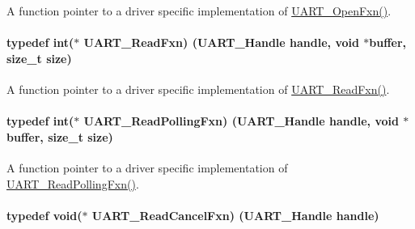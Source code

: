 A function pointer to a driver specific implementation of \hyperlink{_u_a_r_t_8h_a39e21ac60f24eb9ce32286e21de713d1}{U\+A\+R\+T\+\_\+\+Open\+Fxn()}. 

\paragraph[{U\+A\+R\+T\+\_\+\+Read\+Fxn}]{\setlength{\rightskip}{0pt plus 5cm}typedef int($\ast$ U\+A\+R\+T\+\_\+\+Read\+Fxn) ({\bf U\+A\+R\+T\+\_\+\+Handle} handle, void $\ast$buffer, size\+\_\+t size)}\label{_u_a_r_t_8h_a4d855b637a26d787afec822d4cd2978e}


A function pointer to a driver specific implementation of \hyperlink{_u_a_r_t_8h_a4d855b637a26d787afec822d4cd2978e}{U\+A\+R\+T\+\_\+\+Read\+Fxn()}. 

\paragraph[{U\+A\+R\+T\+\_\+\+Read\+Polling\+Fxn}]{\setlength{\rightskip}{0pt plus 5cm}typedef int($\ast$ U\+A\+R\+T\+\_\+\+Read\+Polling\+Fxn) ({\bf U\+A\+R\+T\+\_\+\+Handle} handle, void $\ast$buffer, size\+\_\+t size)}\label{_u_a_r_t_8h_a6b57fb6a7c48272141a727c7de7290e4}


A function pointer to a driver specific implementation of \hyperlink{_u_a_r_t_8h_a6b57fb6a7c48272141a727c7de7290e4}{U\+A\+R\+T\+\_\+\+Read\+Polling\+Fxn()}. 

\paragraph[{U\+A\+R\+T\+\_\+\+Read\+Cancel\+Fxn}]{\setlength{\rightskip}{0pt plus 5cm}typedef void($\ast$ U\+A\+R\+T\+\_\+\+Read\+Cancel\+Fxn) ({\bf U\+A\+R\+T\+\_\+\+Handle} handle)}\label{_u_a_r_t_8h_aa46296acc2c197a775d44458e1eca197}


